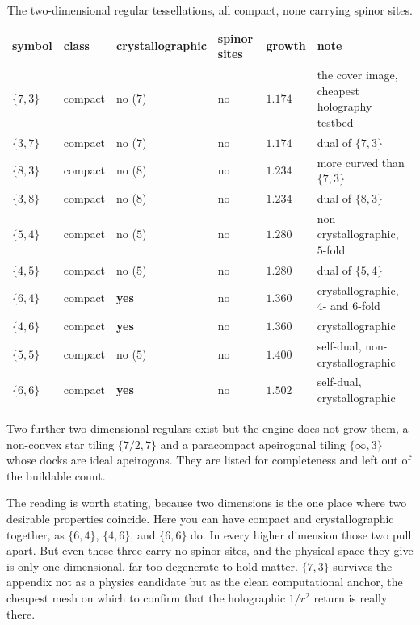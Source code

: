 \begin{table}[ht]
\centering
\begin{tabular}{@{}llllll@{}}
\toprule
symbol & class & crystallographic & spinor sites & growth & note \\
\midrule
$\{7,3\}$ & compact & no ($7$) & no & $1.174$ & the cover image, cheapest holography testbed \\
$\{3,7\}$ & compact & no ($7$) & no & $1.174$ & dual of $\{7,3\}$ \\
$\{8,3\}$ & compact & no ($8$) & no & $1.234$ & more curved than $\{7,3\}$ \\
$\{3,8\}$ & compact & no ($8$) & no & $1.234$ & dual of $\{8,3\}$ \\
$\{5,4\}$ & compact & no ($5$) & no & $1.280$ & non-crystallographic, $5$-fold \\
$\{4,5\}$ & compact & no ($5$) & no & $1.280$ & dual of $\{5,4\}$ \\
$\{6,4\}$ & compact & \textbf{yes} & no & $1.360$ & crystallographic, $4$- and $6$-fold \\
$\{4,6\}$ & compact & \textbf{yes} & no & $1.360$ & crystallographic \\
$\{5,5\}$ & compact & no ($5$) & no & $1.400$ & self-dual, non-crystallographic \\
$\{6,6\}$ & compact & \textbf{yes} & no & $1.502$ & self-dual, crystallographic \\
\bottomrule
\end{tabular}
\caption{The two-dimensional regular tessellations, all compact, none carrying spinor sites.}
\label{tab:catalog-2d}
\end{table}

Two further two-dimensional regulars exist but the engine does not grow them, a non-convex star tiling $\{7/2,7\}$ and a paracompact apeirogonal tiling $\{\infty,3\}$ whose docks are ideal apeirogons. They are listed for completeness and left out of the buildable count.

The reading is worth stating, because two dimensions is the one place where two desirable properties coincide. Here you can have compact and crystallographic together, as $\{6,4\}$, $\{4,6\}$, and $\{6,6\}$ do. In every higher dimension those two pull apart. But even these three carry no spinor sites, and the physical space they give is only one-dimensional, far too degenerate to hold matter. $\{7,3\}$ survives the appendix not as a physics candidate but as the clean computational anchor, the cheapest mesh on which to confirm that the holographic $1/r^2$ return is really there.

